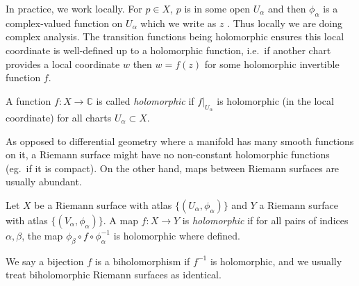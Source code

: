 In practice, we work locally. For \(p\in X\), \(p\) is in some open
\(U_\alpha\) and then \(\phi_\alpha\) is a complex-valued function on
\(U_\alpha\) which we write as \(z\) . Thus locally we are doing complex
analysis. The transition functions being holomorphic ensures this local
coordinate is well-defined up to a holomorphic function, i.e.\ if another chart
provides a local coordinate \(w\) then \(w=f(z)\) for some holomorphic
invertible function \(f\).

\begin{definition}
    A function \(f:X\to \mathbb{C}\) is called \textit{holomorphic} if
    \(f|_{U_\alpha}\) is holomorphic (in the local coordinate) for all charts
    \(U_\alpha\subset X\).
\end{definition}

As opposed to differential geometry where a manifold has many smooth functions
on it, a Riemann surface might have no non-constant holomorphic functions (eg.\
if it is compact). On the other hand, maps between Riemann surfaces are usually
abundant.

\begin{definition}
    Let \(X\) be a Riemann surface with atlas \(\{(U_\alpha, \phi_\alpha)\}\)
    and \(Y\) a Riemann surface with atlas \(\{(V_\alpha,\phi_\alpha)\}\). A
    map \(f:X\to Y\) is \textit{holomorphic} if for all pairs of indices
    \(\alpha, \beta\), the map \(\phi_\beta\circ f\circ \phi_\alpha^{-1}\) is
    holomorphic where defined.
\end{definition}

We say a bijection \(f\) is a biholomorphism if \(f^{-1}\) is holomorphic, and
we usually treat biholomorphic Riemann surfaces as identical.

